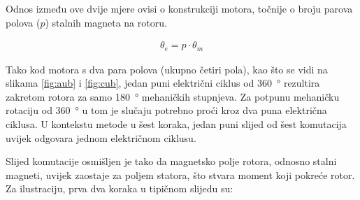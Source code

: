 \documentclass[diplomskirad]{fer}
\begin{document}
Odnos između ove dvije mjere ovisi o konstrukciji motora, točnije o broju
parova polova ($p$) stalnih magneta na rotoru.

\begin{align}
	\theta_e = p \cdot \theta_m
\end{align}

Tako kod motora s dva para polova (ukupno četiri pola), kao što se vidi na
slikama \ref{fig:aub} i \ref{fig:cub}, jedan puni električni ciklus od
\SI{360}{\degree} rezultira zakretom rotora za samo \SI{180}{\degree}
mehaničkih stupnjeva. Za potpunu mehaničku rotaciju od \SI{360}{\degree} u tom
je slučaju potrebno proći kroz dva puna električna ciklusa. U kontekstu metode
u šest koraka, jedan puni slijed od šest komutacija uvijek odgovara jednom
električnom ciklusu.

\bigskip %
Slijed komutacije osmišljen je tako da magnetsko polje rotora, odnosno stalni
magneti, uvijek zaostaje za poljem statora, što stvara moment koji pokreće
rotor. Za ilustraciju, prva dva koraka u tipičnom slijedu su:
\end{document}
